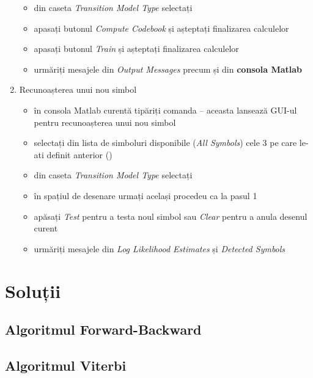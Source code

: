 \documentclass[12pt]{article}
\begin{document}
\begin{enumerate}
\begin{itemize}
			\item din caseta \emph{Transition Model Type} selectați 
			\item apasați butonul \emph{Compute Codebook} și așteptați finalizarea calculelor
			\item apasați butonul \emph{Train} și așteptați finalizarea calculelor
			\item urmăriți mesajele din \emph{Output Messages} precum și din \textbf{consola Matlab}
		\end{itemize}
	\item Recunoașterea unui nou simbol
		\begin{itemize}
			\item în consola Matlab curentă tipăriți comanda  -- aceasta lansează GUI-ul 
			pentru recunoașterea unui nou simbol
			\item selectați din lista de simboluri disponibile (\emph{All Symbols}) cele 3 pe care le-ati definit 
			anterior ()
			\item din caseta \emph{Transition Model Type} selectați 
			\item în spațiul de desenare urmați același procedeu ca la pasul 1
			\item apăsați \emph{Test} pentru a testa noul simbol sau \emph{Clear} pentru a anula desenul curent
			\item urmăriți mesajele din \emph{Log Likelihood Estimates} și \emph{Detected Symbols}
		\end{itemize}
\end{enumerate}


\section{Soluții}
\label{sec:solutions}

\subsection{Algoritmul Forward-Backward}
\label{sec:fb-sol}



\subsection{Algoritmul Viterbi}
\label{sec:viterbi-sol}


\end{document}
